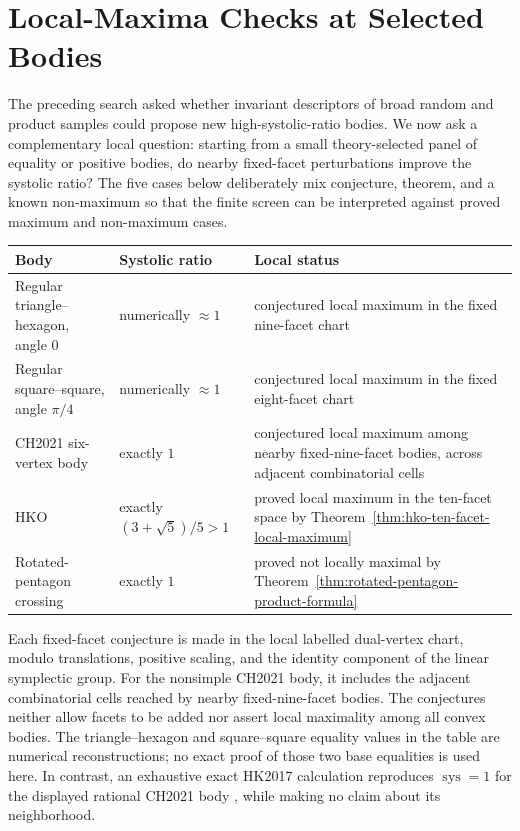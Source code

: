 \clearpage
\section{Local-Maxima Checks at Selected Bodies}
\label{sec:local-maxima-check}

The preceding search asked whether invariant descriptors of broad random and
product samples could propose new high-systolic-ratio bodies.  We now ask a
complementary local question: starting from a small theory-selected panel of
equality or positive bodies, do nearby fixed-facet perturbations improve the
systolic ratio?  The five cases below deliberately mix conjecture, theorem,
and a known non-maximum so that the finite screen can be interpreted against
proved maximum and non-maximum cases.

\begin{center}
\small
\begin{tabular}{@{}p{.25\linewidth}p{.19\linewidth}p{.46\linewidth}@{}}
\toprule
Body & Systolic ratio & Local status \\
\midrule
Regular triangle--hexagon, angle \(0\) & numerically \(\approx1\) & conjectured local maximum in the fixed nine-facet chart \\
Regular square--square, angle \(\pi/4\) & numerically \(\approx1\) & conjectured local maximum in the fixed eight-facet chart \\
CH2021 six-vertex body \cite{CH2021} & exactly \(1\) & conjectured local maximum among nearby fixed-nine-facet bodies, across adjacent combinatorial cells \\
HKO & exactly \((3+\sqrt5)/5>1\) & proved local maximum in the ten-facet space by Theorem~\ref{thm:hko-ten-facet-local-maximum} \\
Rotated-pentagon crossing & exactly \(1\) & proved not locally maximal by Theorem~\ref{thm:rotated-pentagon-product-formula} \\
\bottomrule
\end{tabular}
\end{center}

Each fixed-facet conjecture is made in the local labelled dual-vertex chart,
modulo translations, positive scaling, and the identity component of the
linear symplectic group.  For the nonsimple CH2021 body, it includes the
adjacent combinatorial cells reached by nearby fixed-nine-facet bodies.  The
conjectures neither allow facets to be added nor assert local maximality among
all convex bodies.  The triangle--hexagon and square--square equality values
in the table are numerical reconstructions; no exact proof of those two base
equalities is used here.  In contrast, an exhaustive exact HK2017 calculation
reproduces \(\operatorname{sys}=1\) for the displayed rational CH2021 body
\cite{CH2021},
while making no claim about its neighborhood.

